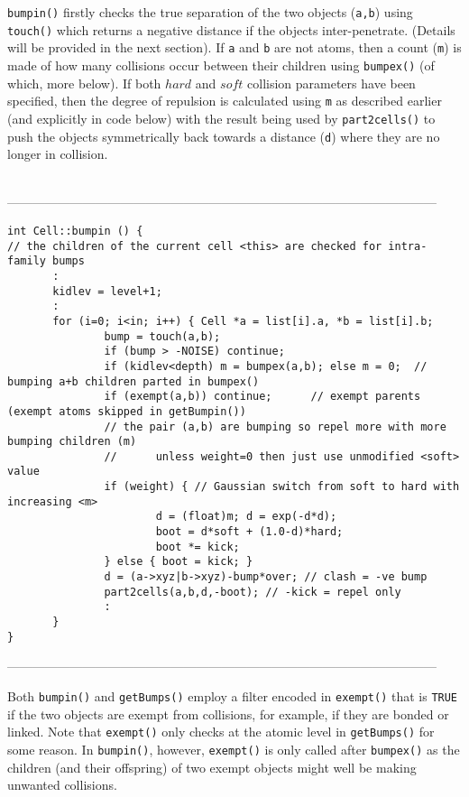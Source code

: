 {\tt bumpin()} firstly checks the true separation of the two objects ({\tt a,b}) using
{\tt touch()} which returns a negative distance if the objects inter-penetrate. (Details
will be provided in the next section).   If {\tt a} and {\tt b} are not atoms, then
a count ({\tt m}) is made of how many collisions occur between their children using {\tt bumpex()}
(of which, more below).  If both $hard$ and $soft$ collision parameters have been specified,
then the degree of repulsion is calculated using {\tt m} as described earlier (and explicitly
in code below) with the result being used by {\tt part2cells()} to push the objects symmetrically
back towards a distance ({\tt d}) where they are no longer in collision. 
\begin{singlespace}
\ \\
------------------------------------------------------------------------------------------------------
\begin{tiny}
\begin{verbatim}
int Cell::bumpin () {
// the children of the current cell <this> are checked for intra-family bumps
       :
       kidlev = level+1;
       :
       for (i=0; i<in; i++) { Cell *a = list[i].a, *b = list[i].b;
               bump = touch(a,b);
               if (bump > -NOISE) continue;
               if (kidlev<depth) m = bumpex(a,b); else m = 0;  // bumping a+b children parted in bumpex() 
               if (exempt(a,b)) continue;      // exempt parents (exempt atoms skipped in getBumpin()) 
               // the pair (a,b) are bumping so repel more with more bumping children (m)
               //      unless weight=0 then just use unmodified <soft> value
               if (weight) { // Gaussian switch from soft to hard with increasing <m>
                       d = (float)m; d = exp(-d*d);
                       boot = d*soft + (1.0-d)*hard;
                       boot *= kick;
               } else { boot = kick; }
               d = (a->xyz|b->xyz)-bump*over; // clash = -ve bump
               part2cells(a,b,d,-boot); // -kick = repel only
               :
       }
}
\end{verbatim}
\end{tiny}
------------------------------------------------------------------------------------------------------
\end{singlespace}

Both {\tt bumpin()} and {\tt getBumps()} employ a filter encoded in {\tt exempt()} that is
{\tt TRUE} if the two objects are exempt from collisions, for example, if they are bonded or linked.
Note that {\tt exempt()} only checks at the atomic level in {\tt getBumps()} for some reason. 
In  {\tt bumpin()}, however, {\tt exempt()} is only called after  {\tt bumpex()} as the children
(and their offspring) of two exempt objects might well be making unwanted collisions.

